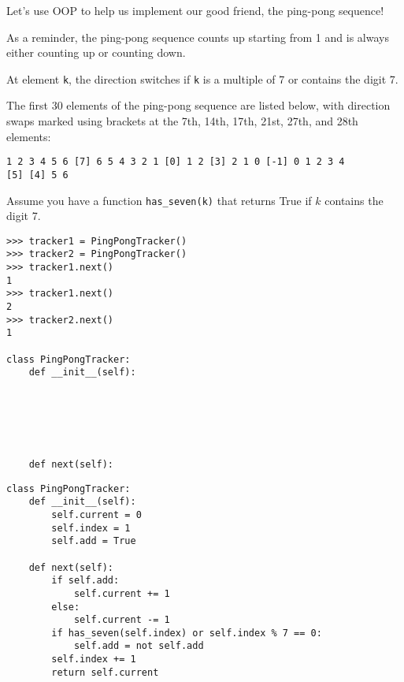 \begin{blocksection}
\question Let's use OOP to help us implement our good friend, the ping-pong sequence!

As a reminder, the ping-pong sequence counts up starting from 1 and is
always either counting up or counting down.

At element \lstinline{k}, the direction switches if \lstinline{k} is a multiple of 7 or contains the
digit 7.

The first 30 elements of the ping-pong sequence are listed below, with direction
swaps marked using brackets at the 7th, 14th, 17th, 21st, 27th, and 28th
elements:
\begin{lstlisting}
1 2 3 4 5 6 [7] 6 5 4 3 2 1 [0] 1 2 [3] 2 1 0 [-1] 0 1 2 3 4
[5] [4] 5 6
\end{lstlisting}

Assume you have a function \texttt{has\_seven(k)} that returns True if $k$ contains the digit 7.

\vspace{1\baselineskip}
\begin{lstlisting}
>>> tracker1 = PingPongTracker()
>>> tracker2 = PingPongTracker()
>>> tracker1.next()
1
>>> tracker1.next()
2
>>> tracker2.next()
1

class PingPongTracker:
    def __init__(self):






    def next(self):
\end{lstlisting}
\end{blocksection}

\begin{blocksection}
\begin{solution}[0.3in]
\begin{lstlisting}
class PingPongTracker:
    def __init__(self):
        self.current = 0
        self.index = 1
        self.add = True

    def next(self):
        if self.add:
            self.current += 1
        else:
            self.current -= 1
        if has_seven(self.index) or self.index % 7 == 0:
            self.add = not self.add
        self.index += 1
        return self.current

\end{lstlisting}
\end{solution}

\end{blocksection}

